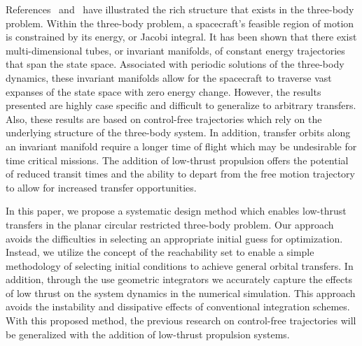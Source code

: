 \documentclass[preprint]{elsarticle}
\begin{document}
References~ and~ have illustrated the rich structure that exists in the three-body problem.
Within the three-body problem, a spacecraft's feasible region of motion is constrained by its energy, or Jacobi integral. 
It has been shown that there exist multi-dimensional tubes, or invariant manifolds, of constant energy trajectories that span the state space. 
Associated with periodic solutions of the three-body dynamics, these invariant manifolds allow for the spacecraft to traverse vast expanses of the state space with zero energy change. 
However, the results presented are highly case specific and difficult to generalize to arbitrary transfers.
Also, these results are based on control-free trajectories which rely on the underlying structure of the three-body system.
In addition, transfer orbits along an invariant manifold require a longer time of flight which may be undesirable for time critical missions.
The addition of low-thrust propulsion offers the potential of reduced transit times and the ability to depart from the free motion trajectory to allow for increased transfer opportunities. 

In this paper, we propose a systematic design method which enables low-thrust transfers in the planar circular restricted three-body problem.
Our approach avoids the difficulties in selecting an appropriate initial guess for optimization.
Instead, we utilize the concept of the reachability set to enable a simple methodology of selecting initial conditions to achieve general orbital transfers. 
In addition, through the use geometric integrators we accurately capture the effects of low thrust on the system dynamics in the numerical simulation. 
This approach avoids the instability and dissipative effects of conventional integration schemes.
With this proposed method, the previous research on control-free trajectories will be generalized with the addition of low-thrust propulsion systems.

\end{document}
